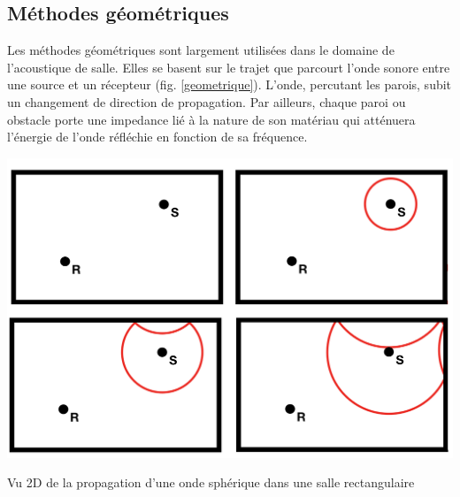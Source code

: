 %
%







	\subsection{Méthodes géométriques}
	
Les méthodes géométriques sont largement utilisées dans le domaine de l'acoustique de salle. Elles se basent sur le trajet que parcourt l'onde sonore entre une source et un récepteur (fig. \ref{geometrique}). L'onde, percutant les parois, subit un changement de direction de propagation. Par ailleurs, chaque paroi ou obstacle porte une \gls{impedance} lié à la nature de son matériau qui atténuera l'énergie de l'onde réfléchie en fonction de sa fréquence.

\begin{figureth}
	\includegraphics[width=0.8\linewidth]{images/geometrique}
	\caption{Vu 2D de la propagation d'une onde sphérique dans une salle rectangulaire}
	\label{geometrique}
\end{figureth}

